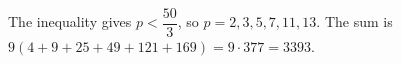 The inequality gives $p<\dfrac{50}{3}$, so $p=2,3,5,7,11,13$. The sum is $9(4+9+25+49+121+169)=9\cdot 377=\boxed{3393}$.
